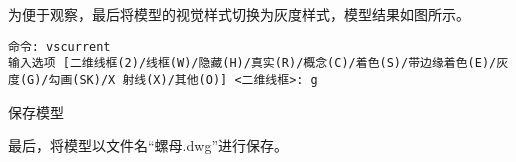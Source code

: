 \begin{procedure}
为便于观察，最后将模型的视觉样式切换为灰度样式，模型结果如图所示。


\begin{lstlisting}
命令: vscurrent
输入选项 [二维线框(2)/线框(W)/隐藏(H)/真实(R)/概念(C)/着色(S)/带边缘着色(E)/灰度(G)/勾画(SK)/X 射线(X)/其他(O)] <二维线框>: g
\end{lstlisting}

\begin{figure}[htbp]
\centering
\begin{floatrow}[2]
\end{floatrow}
\end{figure}
\item 保存模型

最后，将模型以文件名“螺母.dwg”进行保存。
\end{procedure}
\endinput